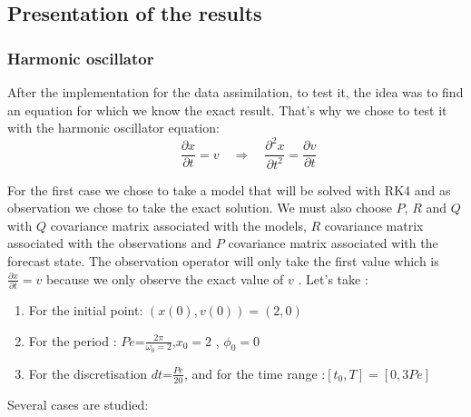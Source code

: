 \subsection{Presentation of the results}
\subsubsection{Harmonic oscillator}
\noindent After the implementation for the data assimilation, to test it, the idea was to find an equation for which we know the exact result. That's why we chose to test it with the harmonic oscillator equation:
$$\qquad \frac{\partial x}{\partial t}=v \quad \Rightarrow \quad \frac{\partial^2 x}{\partial t^2}=\frac{\partial v}{\partial t}$$



\noindent For the first case we chose to take a model that will be solved with RK4 and as observation we chose to take the exact solution. We must also choose $P$, $R$ and $Q$ with $Q$ covariance matrix associated with the models, $R$ covariance matrix associated with the observations and $P$ covariance matrix associated with the forecast state.
The observation operator will only take the first value which is $\frac{\partial x}{\partial t}=v$ because we only observe the exact value of $v$ .
\newpage
\noindent Let's take :
\begin{enumerate}[label=\textbullet]
  \item For the initial point: $(x(0),v(0))=(2,0)$ 
  \item For the period : \; $Pe$=$\frac{2\pi}{\omega_0=2}$,\quad $x_0=2$ \quad, $\phi_0=0$ 
  \item For the discretisation $dt$=$\frac{Pe}{20}$, and for the time range :\quad $[t_0,T]=[0,3Pe]$
\end{enumerate}
\noindent\newline Several cases are studied:
